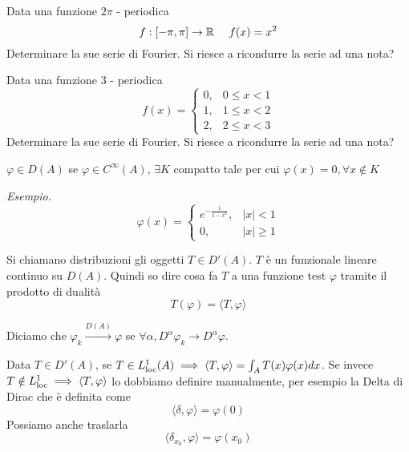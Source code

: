 Data una funzione $2\pi $ - periodica
\begin{equation*}
f:[ - \pi, \pi ]\rightarrow \mathbb{R} \ \ \ \ f(x) = x^{2}
\end{equation*}
Determinare la sue serie di Fourier. Si riesce a ricondurre la serie ad una nota?
\Esercizio{}

Data una funzione $3$ - periodica
\begin{equation*}
f(x) =
\begin{cases}
0, & 0 \leq x < 1\\
1, & 1 \leq x < 2\\
2, & 2 \leq x < 3
\end{cases}
\end{equation*}
Determinare la sue serie di Fourier. Si riesce a ricondurre la serie ad una nota?
\Esercizio{}
\begin{defn}
 $\varphi \in D(A)$ se $\varphi \in C^{\infty}(A)$, $\exists K$ compatto tale per cui $\varphi (x) = 0, \forall x\notin K$
\end{defn}
\textit{Esempio.}
\begin{equation*}
\varphi (x) =
\begin{cases}
e^{- \frac{1}{1 - x^{2}}}, & | x| < 1\\
0, & | x| \geq 1
\end{cases}
\end{equation*}
\begin{defn}
[Distribuzione] Si chiamano distribuzioni gli oggetti $T\in D'(A)$. $T$ è un funzionale lineare continuo su $D(A)$. Quindi so dire cosa fa $T$ a una funzione test $\varphi $ tramite il prodotto di dualità
\begin{equation*}
T(\varphi) = \langle T, \varphi \rangle
\end{equation*}
\end{defn}
\begin{defn}
 Diciamo che $\varphi_{k}\xrightarrow{D(A)} \varphi $ se $\forall \alpha, D^{\alpha} \varphi_{k}\rightarrow D^{\alpha} \varphi $.
\end{defn}
\begin{defn}
 Data $T\in D'(A)$, se $T\in L^{1}_{\operatorname{loc}}(A) \implies \langle T, \varphi \rangle = \int_{A} T(x) \varphi (x) dx$. Se invece $T\notin L^{1}_{\operatorname{loc}} \implies \langle T, \varphi \rangle $ lo dobbiamo definire manualmente, per esempio la Delta di Dirac che è definita come
\begin{equation*}
\langle \delta, \varphi \rangle = \varphi (0)
\end{equation*}
Possiamo anche traslarla
\begin{equation*}
\langle \delta_{x_{0}}, \varphi \rangle = \varphi (x_{0})
\end{equation*}
\end{defn}
